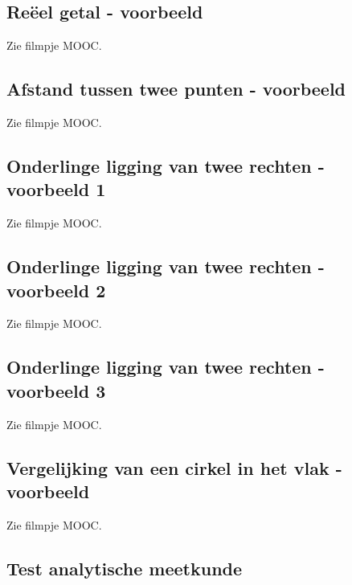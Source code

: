 

\subsection{Re\"eel getal - voorbeeld} 
Zie filmpje MOOC.





\subsection{Afstand tussen twee punten - voorbeeld} 
Zie filmpje MOOC.





\subsection{Onderlinge ligging van twee rechten - voorbeeld 1}
Zie filmpje MOOC.

\subsection{Onderlinge ligging van twee rechten - voorbeeld 2}
Zie filmpje MOOC.

\subsection{Onderlinge ligging van twee rechten - voorbeeld 3}
Zie filmpje MOOC.





\subsection{Vergelijking van een cirkel in het vlak - voorbeeld}
Zie filmpje MOOC.

\subsection{Test analytische meetkunde}